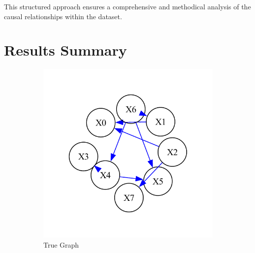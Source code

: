 \documentclass{article}
\begin{document}
        
        This structured approach ensures a comprehensive and methodical analysis of the causal relationships within the dataset.
        

\section{Results Summary}

\begin{figure}[H]
    \centering
    \begin{subfigure}{0.45\textwidth}
        \centering
        \vspace{-0.5cm}
        \includegraphics[width=\linewidth]{postprocess/test_data/20241007_184921_base_nodes8_samples1500/output_graph/true_graph.pdf}
        \vfill
        \caption{True Graph}
        \label{fig:sub1}
    \end{subfigure}
    \hspace{0.04\textwidth}
    \begin{subfigure}{0.45\textwidth}
        \centering
        \vspace{-0.5cm}

\end{subfigure}
\end{figure}
\end{document}
